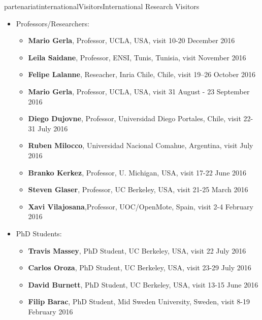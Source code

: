 \documentclass{ra2016}
\begin{document}
\begin{module}{partenariat}{internationalVisitors}{International Research Visitors}
\begin{itemize}
    \item Professors/Researchers:
        \begin{itemize}
            \item{\bf Mario Gerla},    Professor,   UCLA,                       USA,       visit 10-20 December 2016
            \item{\bf Leila Saidane},  Professor,   ENSI, Tunis,                Tunisia,   visit November 2016
            \item{\bf Felipe Lalanne}, Reseacher,   Inria Chile,                Chile,     visit 19–26 October 2016
            \item{\bf Mario Gerla},    Professor,   UCLA,                       USA,       visit 31 August - 23 September 2016
            \item{\bf Diego Dujovne},  Professor,   Universidad Diego Portales, Chile,     visit 22-31 July 2016
            \item{\bf Ruben Milocco},  Universidad Nacional Comahue,            Argentina, visit July 2016
            \item{\bf Branko Kerkez},  Professor,   U. Michigan,                USA,       visit 17-22 June 2016
            \item{\bf Steven Glaser},  Professor,   UC Berkeley,                USA,       visit 21-25 March 2016
            \item{\bf Xavi Vilajosana},Professor,   UOC/OpenMote,               Spain,     visit 2-4 February 2016
        \end{itemize}
    \item PhD Students:
        \begin{itemize}
            \item{\bf Travis Massey},  PhD Student, UC Berkeley,                USA,       visit 22 July 2016
            \item{\bf Carlos Oroza},   PhD Student, UC Berkeley,                USA,       visit 23-29 July 2016
            \item{\bf David Burnett},  PhD Student, UC Berkeley,                USA,       visit 13-15 June 2016
            \item{\bf Filip Barac},    PhD Student, Mid Sweden University,      Sweden,    visit 8-19 February 2016
        \end{itemize}
\end{itemize}


\end{module}
\end{document}
